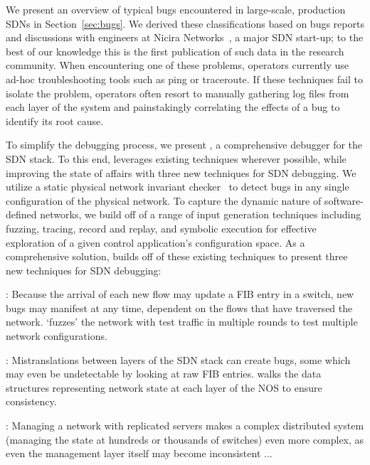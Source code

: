 We present an overview of typical bugs encountered in large-scale, production SDNs in Section~\ref{sec:bugs}.
We derived these classifications based on bugs reports and discussions with engineers at Nicira Networks~\cite{nicira}, 
a major SDN start-up;
to the best of our knowledge this is the first publication of such data in the research community.
When encountering one of these problems,
operators currently use ad-hoc troubleshooting tools such as ping or traceroute.
If these techniques fail to isolate the problem, operators often resort to
manually gathering log files from each layer of the system and painstakingly
correlating the effects of a bug to identify its root cause.

To simplify the debugging process, we present \projectname{}, a comprehensive debugger for the SDN stack.
To this end, \projectname{} leverages existing techniques wherever possible, while improving the state of affairs
with three new techniques for SDN debugging. We utilize a static physical network invariant
checker~\cite{anteater} to detect bugs in any single configuration of the
physical network. To capture the dynamic nature of software-defined networks,
we build off of a range of input generation techniques including fuzzing, tracing, record and
replay, and symbolic execution for effective exploration of a given control
application's configuration space. 
As a comprehensive solution, \projectname{} builds off of these existing techniques to present
 three new techniques for SDN debugging:

:  Because the arrival of each new flow may update a FIB entry in a switch,
 new bugs may
manifest at any time, dependent on the flows that have traversed the network. \projectname{} `fuzzes' the network with 
test traffic in multiple rounds to test multiple network configurations.

: Mistranslations between layers of the SDN stack can create bugs, some which
may even be undetectable by looking at raw FIB entries. \projectname{} walks the data structures representing network state
at each layer of the NOS to ensure consistency.

: Managing a network with replicated servers makes a complex distributed system (managing the state at hundreds or thousands of switches) even more complex, as even the management layer itself may become inconsistent
\projectname{}...

